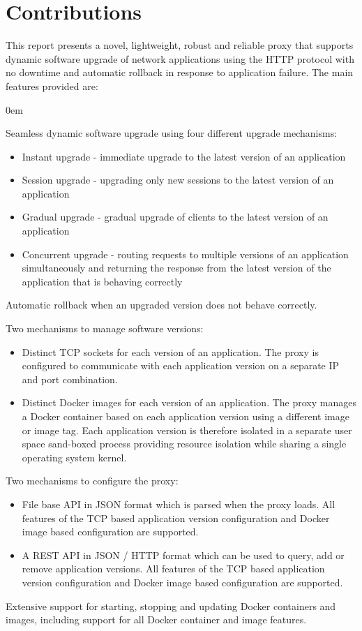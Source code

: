 \documentclass[a4paper,11pt,twoside]{report}
\begin{document}
\section{Contributions}
This report presents a novel, lightweight, robust and reliable proxy that supports dynamic software upgrade of network applications using the HTTP protocol with no downtime and automatic rollback in response to application failure. The main features provided are:
\begin{list}{-}{}
\itemsep0em
\item Seamless dynamic software upgrade using four different upgrade mechanisms:
	\begin{itemize}
		\item{Instant upgrade} - immediate upgrade to the latest version of an application 
		\item{Session upgrade} - upgrading only new sessions to the latest version of an application 
		\item{Gradual upgrade} - gradual upgrade of clients to the latest version of an application
		\item{Concurrent upgrade} - routing requests to multiple versions of an application simultaneously and returning the response from the latest version of the application that is behaving correctly 
	\end{itemize}
\item Automatic rollback when an upgraded version does not behave correctly. 
\item Two mechanisms to manage software versions:
	\begin{itemize}
		\item Distinct TCP sockets for each version of an application.  The proxy is configured to communicate with each application version on a separate IP and port combination.
		\item Distinct Docker images for each version of an application.  The proxy manages a Docker container based on each application version using a different image or image tag.  Each application version is therefore isolated in a separate user space sand-boxed process providing resource isolation while sharing a single operating system kernel. 
	\end{itemize}
\item Two mechanisms to configure the proxy:
	\begin{itemize}
		\item File base API in JSON format which is parsed when the proxy loads. All features of the TCP based application version configuration and Docker image based configuration are supported.
		\item A REST API in JSON / HTTP format which can be used to query, add or remove application versions.  All features of the TCP based application version configuration and Docker image based configuration are supported.
	\end{itemize}
\item Extensive support for starting, stopping and updating Docker containers and images, including support for all Docker container and image features.	
\end{list}
\end{document}
